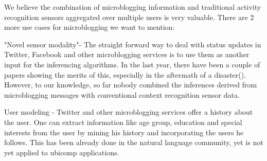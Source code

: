 We believe the combination of microblogging information and
traditional activity recognition sensors aggregated over multiple users
is very valuable. 
There are 2 more use cases for microblogging we want to mention:
\begin{description}
 \item{"Novel sensor modality"}-
The straight forward way to deal with status updates
in Twitter, Facebook and other microblogging services is to use them as another
input for the inferencing algorithms. In the last year, there have been a couple of 
papers showing the merits of this, especially in the aftermath of a disaster(\cite{Vieweg:2010jd}). However,
to our knowledge, so far nobody combined the inferences derived from microblogging messages with
conventional context recognition sensor data.
 \item{User modeling} - Twitter and other microblogging services offer a history about
the user. One can extract information like age group, education and special interests
from the user by mining his history and incorporating the users he follows. This has been
already done in the natural language community, yet is not yet applied to ubicomp 
applications.
\end{description}




